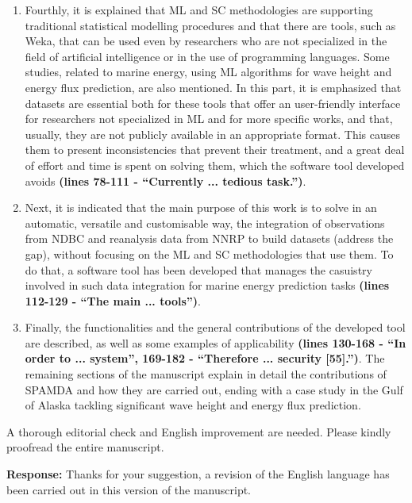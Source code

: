 \documentclass[a4paper,twoside,11pt]{article}
\newcounter{comments}[section]
\newcommand{\rcomment}[1]
{
	\stepcounter{comments}
	\vspace{0.6cm}
	\begin{tcolorbox}[colback=black!5,colframe=white!45!black,title=Comment \arabic{comments}]
		#1
	\end{tcolorbox}
}
\begin{document}
{\begin{enumerate}
    \item Fourthly, it is explained that ML and SC methodologies are supporting traditional statistical modelling procedures and that there are tools, such as Weka, that can be used even by researchers who are not specialized in the field of artificial intelligence or in the use of programming languages.  Some studies, related to marine energy, using ML algorithms for wave height and energy flux prediction, are also mentioned. In this part, it is emphasized that datasets are  essential both for these tools that offer an user-friendly interface for researchers not specialized in ML and for more specific works, and that, usually, they are not publicly available in an appropriate format. This causes them to present inconsistencies that prevent their treatment, and a great deal of effort and time is spent on solving them, which the software tool developed avoids  \textbf{(lines 78-111 - ``Currently ... tedious task.'')}.  
    
    \item Next, it is indicated that the main purpose of this work is to solve in an automatic, versatile and customisable way, the integration of observations from NDBC and reanalysis data from NNRP to build datasets (address the gap), without focusing on the ML and SC methodologies that use them. To do that, a software tool has been developed that manages the casuistry involved in such data integration for marine energy prediction tasks \textbf{(lines 112-129 - ``The main ... tools'')}.
        
    \item Finally, the functionalities and the general contributions of the developed tool are described, as well as some examples of applicability \textbf{(lines 130-168 - ``In order to ... system'', 169-182  - ``Therefore ... security [55].'')}. The remaining sections of the manuscript explain in detail the contributions of SPAMDA and how they are carried out, ending with a case study in the Gulf of Alaska tackling significant wave height and energy flux prediction.
\end{enumerate}
}

\rcomment
{
A thorough editorial check and English improvement are needed. Please kindly proofread the entire manuscript.

}

\textbf{Response:}
{
Thanks for your suggestion, a revision of the English language has been carried out in this version of the manuscript.
}
\end{document}
